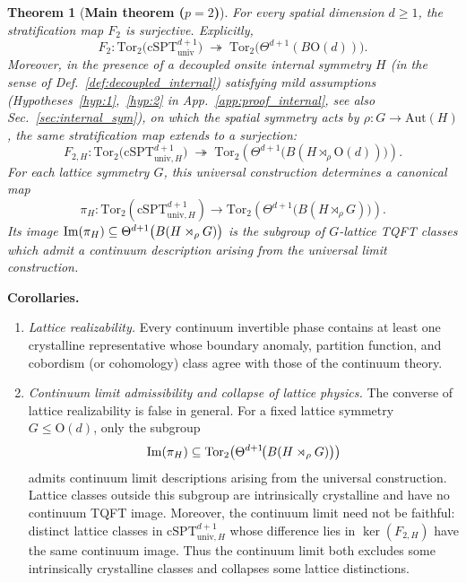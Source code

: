 \documentclass[aps,prx,reprint,superscriptaddress,twocolumn,amsmath,amssymb,amsfonts, nofootinbib]{revtex4-2}
\newcommand{\im}{{\rm Im}}
\newcommand{\csptu}{\mathrm{cSPT}^{d+1}_{\mathrm{univ}}}
\newcommand{\tor}{\text{Tor}}
\theoremstyle{apsstyle}
\newtheorem{theorem}{Theorem}[section]
\begin{document}
\begin{theorem}[\textbf{Main theorem ($p=2$)}]
\label{theorem:main}
For every spatial dimension $d\ge 1$,
the stratification map $F_{2}$ is surjective.
Explicitly,
\begin{equation}
   F_{2}:
        \tor_{2}\bigl(\csptu\bigr)
   \;\twoheadrightarrow\;
   \tor_{2}\bigl(\Theta^{d+1}(B\mathrm{O}(d))\bigr).
   \label{eq:maintheorem}
\end{equation}
Moreover, in the presence of a decoupled onsite internal symmetry $H$ (in the sense of Def.~\ref{def:decoupled_internal}) satisfying mild assumptions (Hypotheses~\ref{hyp:1},~\ref{hyp:2} in App.~\ref{app:proof_internal}, see also Sec.~\ref{sec:internal_sym}), on which the spatial symmetry acts by $\rho:G\to \mathrm{Aut}(H)$, the same stratification map extends to a surjection:
\begin{equation}
F_{2,H}:
\tor_{2}\bigl( \mathrm{cSPT}^{d+1}_{\mathrm{univ}, H} \bigr)
\;\twoheadrightarrow\;
\tor_{2}\left(\Theta^{d+1} \bigl(B(H\rtimes_{\rho} \mathrm{O}(d))\bigr)\right).
\label{eq:maintheorem_H}
\end{equation}
\noindent For each lattice symmetry $G$, this universal construction determines a canonical map
\begin{equation*}
\pi_H:\tor_{2}\left(\mathrm{cSPT}^{d+1}_{\mathrm{univ},H}\right)\longrightarrow \tor_{2}\left(\Theta^{d+1}\!\bigl(B(H\rtimes_{\rho}G)\bigr)\right).
\end{equation*}
Its image $\im(\pi_H)\subseteq \Theta^{d+1}\bigl(B(H\rtimes_{\rho}G)\bigr)$ is the subgroup of $G$-lattice TQFT classes which admit a continuum description arising from the universal limit construction.
\end{theorem}
\medskip
\noindent\textbf{Corollaries.}
\begin{enumerate}
\item \emph{Lattice realizability.}
      Every continuum invertible phase contains at least one crystalline
      representative whose boundary anomaly, partition function, and
      cobordism (or cohomology) class agree with those of the continuum
      theory.
\item \emph{Continuum limit admissibility and collapse of lattice physics.}
The converse of lattice realizability is false in general. For a fixed lattice
symmetry $G\leq \mathrm{O}(d)$, only the subgroup
\begin{equation}
\im(\pi_H)
\subseteq
\tor_2\!\left(\Theta^{d+1}\!\bigl(B(H\rtimes_{\rho}G)\bigr)\right)
\end{equation}
admits continuum limit descriptions arising from the universal construction. Lattice classes outside this subgroup are intrinsically crystalline and have no continuum TQFT image. Moreover, the continuum limit need not be faithful: distinct lattice classes in $\mathrm{cSPT}^{d+1}_{\mathrm{univ},H}$ whose difference lies in $\ker(F_{2,H})$ have the same continuum image. Thus the continuum limit both excludes some intrinsically crystalline classes and collapses some lattice distinctions.
\end{enumerate}
\end{document}
